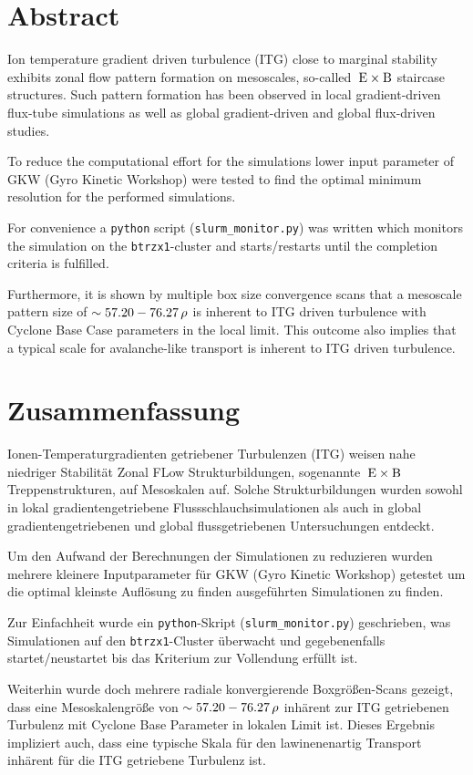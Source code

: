 \chapter*{Abstract}
\label{chap:abstractENG}

Ion temperature gradient driven turbulence (ITG) close to marginal stability exhibits zonal flow pattern formation on mesoscales, so-called $\mathrm{\:E}\times\mathrm{B}$ staircase structures. Such pattern formation has been observed in local gradient-driven flux-tube simulations as well as global gradient-driven and global flux-driven studies. \bigskip

To reduce the computational effort for the simulations lower input parameter of GKW (Gyro Kinetic Workshop) were tested to find the optimal minimum resolution for the performed simulations. \bigskip

For convenience a \texttt{python} script (\texttt{slurm\_monitor.py}) was written which monitors the simulation on the \texttt{btrzx1}-cluster and starts/restarts until the completion criteria is fulfilled. \bigskip

Furthermore, it is shown by multiple box size convergence scans that a mesoscale pattern  size of $\sim 57.20-76.27\,\rho$ is inherent to ITG driven turbulence with Cyclone Base Case parameters in the local limit. This outcome also implies that a typical scale for avalanche-like transport is inherent to ITG driven turbulence.

\chapter*{Zusammenfassung}
\label{chap:abstractDE}

Ionen-Temperaturgradienten getriebener Turbulenzen (ITG) weisen nahe niedriger Stabilität Zonal FLow Strukturbildungen, sogenannte $\mathrm{\:E}\times\mathrm{B}$ Treppenstrukturen, auf Mesoskalen auf. Solche Strukturbildungen wurden sowohl in lokal gradientengetriebene Flussschlauchsimulationen als auch in global gradientengetriebenen und global flussgetriebenen Untersuchungen entdeckt. \bigskip

Um den Aufwand der Berechnungen der Simulationen zu reduzieren wurden mehrere kleinere Inputparameter für GKW (Gyro Kinetic Workshop) getestet um die optimal kleinste Auflösung zu finden ausgeführten Simulationen zu finden. \bigskip

Zur Einfachheit wurde ein \texttt{python}-Skript (\texttt{slurm\_monitor.py}) geschrieben, was Simulationen auf den \texttt{btrzx1}-Cluster überwacht und gegebenenfalls startet/neustartet bis das Kriterium zur Vollendung erfüllt ist. \bigskip

Weiterhin wurde doch mehrere radiale konvergierende Boxgrößen-Scans gezeigt, dass eine Mesoskalengröße von $\sim 57.20-76.27\,\rho$ inhärent zur ITG getriebenen Turbulenz mit Cyclone Base Parameter in lokalen Limit ist. Dieses Ergebnis impliziert auch, dass eine typische Skala für den lawinenenartig Transport inhärent für die ITG getriebene Turbulenz ist.